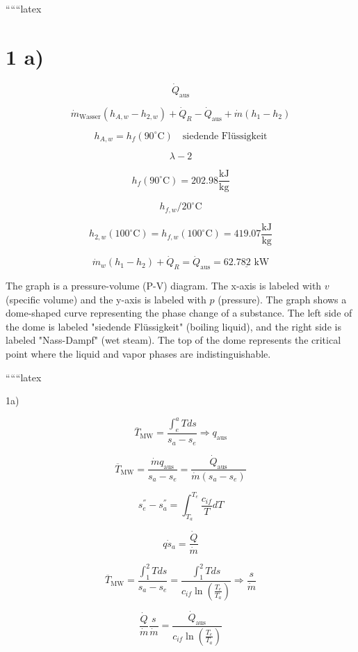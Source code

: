 
``````latex


\section*{1 a)}

\[
\dot{Q}_{\text{aus}}
\]


\[
\dot{m}_{\text{Wasser}} (h_{A,w} - h_{2,w}) + \dot{Q}_R - \dot{Q}_{\text{aus}} + \dot{m} (h_1 - h_2)
\]

\[
h_{A,w} = h_f (90^\circ \text{C}) \quad \text{siedende Flüssigkeit}
\]

\[
\lambda - 2
\]

\[
h_f (90^\circ \text{C}) = 202.98 \frac{\text{kJ}}{\text{kg}}
\]

\[
h_{f,w} / 20^\circ \text{C}
\]

\[
h_{2,w} (100^\circ \text{C}) = h_{f,w} (100^\circ \text{C}) = 419.07 \frac{\text{kJ}}{\text{kg}}
\]

\[
\dot{m}_w (h_1 - h_2) + \dot{Q}_R = \dot{Q}_{\text{aus}} = \underline{62.782 \text{ kW}}
\]


The graph is a pressure-volume (P-V) diagram. The x-axis is labeled with $v$ (specific volume) and the y-axis is labeled with $p$ (pressure). The graph shows a dome-shaped curve representing the phase change of a substance. The left side of the dome is labeled "siedende Flüssigkeit" (boiling liquid), and the right side is labeled "Nass-Dampf" (wet steam). The top of the dome represents the critical point where the liquid and vapor phases are indistinguishable.

``````latex

1a)

\[
\overline{T}_{\text{MW}} = \frac{\int_e^a T ds}{s_a - s_e} \Rightarrow q_{\text{aus}}
\]

\[
\overline{T}_{\text{MW}} = \frac{\dot{m} q_{\text{aus}}}{s_a - s_e} = \frac{\dot{Q}_{\text{aus}}}{\dot{m} (s_a - s_e)}
\]

\[
s_e^{''} - s_a^{''} = \int_{T_a}^{T_e} \frac{c_{if}}{T} dT
\]

\[
q \dot{s}_a = \frac{\dot{Q}}{\dot{m}}
\]

\[
\overline{T}_{\text{MW}} = \frac{\int_1^2 T ds}{s_a - s_e} = \frac{\int_1^2 T ds}{c_{if} \ln \left( \frac{T_e}{T_a} \right)} \Rightarrow \frac{s}{\dot{m}}
\]

\[
\frac{\dot{Q}}{\dot{m}} \frac{s}{\dot{m}} = \frac{\dot{Q}_{\text{aus}}}{c_{if} \ln \left( \frac{T_e}{T_a} \right)}
\]


